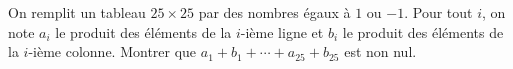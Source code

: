On remplit un tableau $25 \times 25$ par des nombres égaux à $1$ ou $-1$. Pour tout $i$, on note $a_i$ le produit des éléments de la $i$-ième ligne et $b_i$ le produit des éléments de la $i$-ième colonne. Montrer que $a_1 + b_1 + \cdots + a_{25} + b_{25}$ est non nul.
